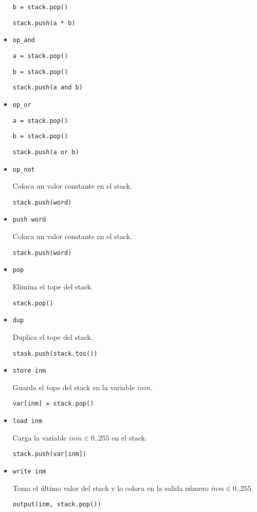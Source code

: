 \begin{itemize}
  \texttt{b = stack.pop()}

  \texttt{stack.push(a * b)}

\item \texttt{op\_and}

  \texttt{a = stack.pop()}

  \texttt{b = stack.pop()}

  \texttt{stack.push(a and b)}

\item \texttt{op\_or}

  \texttt{a = stack.pop()}

  \texttt{b = stack.pop()}

  \texttt{stack.push(a or b)}

\item \texttt{op\_not}

  Coloca un valor constante en el stack.

  \texttt{stack.push(word)}

\item \texttt{push word}

  Coloca un valor constante en el stack.

  \texttt{stack.push(word)}

\item \texttt{pop}

  Elimina el tope del stack.

  \texttt{stack.pop()}

\item \texttt{dup}

  Duplica el tope del stack.

  \texttt{stask.push(stack.tos())}

\item \texttt{store inm}

  Guarda el tope del stack en la variable $inm$.

  \texttt{var[inm] = stack.pop()}

\item \texttt{load inm}

  Carga la variable $inm \in {0..255}$ en el stack.

  \texttt{stack.push(var[inm])}

\item \texttt{write inm}

  Toma el último valor del stack y lo coloca en la 
  salida número $inm \in {0..255}$.

  \texttt{output(inm, stack.pop())}

\end{itemize}
